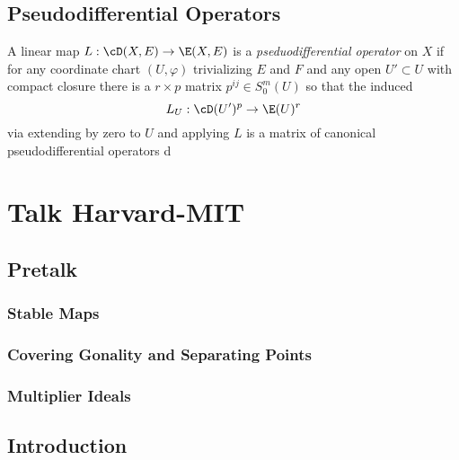 \documentclass[12pt]{article}
\theoremstyle{plain}
\begin{document}
\subsection{Pseudodifferential Operators}

\begin{defn} [1, Def. 3.7]
A linear map $L : \cD(X, E) \to \E(X, E)$ is a \textit{pseduodifferential operator} on $X$ if for any coordinate chart $(U, \varphi)$ trivializing $E$ and $F$ and any open $U' \subset U$ with compact closure there is a $r \times p$ matrix $p^{ij} \in S^m_0(U)$ so that the induced 
\[ L_U : \cD(U')^p \to \E(U)^r \]
via extending by zero to $U$ and applying $L$ is a matrix of canonical pseudodifferential operators d
\end{defn}


\section{Talk Harvard-MIT}

\subsection{Pretalk}

\subsubsection{Stable Maps}

\subsubsection{Covering Gonality and Separating Points}

\subsubsection{Multiplier Ideals}

\subsection{Introduction}
\end{document}
